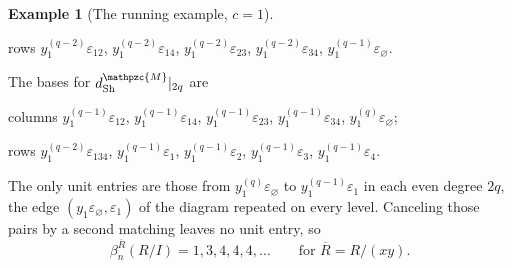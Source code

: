 \documentclass[12pt]{amsart}
\theoremstyle{plain}
\theoremstyle{definition}
\newtheorem{example}[theorem]{Example}
\newcommand{\Rbar}{\overline{R}}
\newcommand{\lift}[1]{\mathpzc{#1}}
\newcommand{\Sh}{\mathrm{Sh}}
\newcommand{\eps}{\varepsilon}
\begin{document}
\begin{example}[The running example, $c = 1$]
    \begin{center}
        rows $y_1^{(q-2)}\eps_{12}$, $y_1^{(q-2)}\eps_{14}$, $y_1^{(q-2)}\eps_{23}$, $y_1^{(q-2)}\eps_{34}$, $y_1^{(q-1)} \eps_\varnothing$.
    \end{center}
    The bases for $d_{\Sh}^{\lift{M}}|_{2q}$ are
    \begin{center}
        columns
     $y_1^{(q-1)} \eps_{12}$, $y_1^{(q-1)} \eps_{14}$, $y_1^{(q-1)} \eps_{23}$, $y_1^{(q-1)} \eps_{34}$, $y_1^{(q)} \eps_\varnothing$;
    \end{center}
    \begin{center}
        rows $y_1^{(q-2)}\eps_{134}$, $y_1^{(q-1)} \eps_1$, $y_1^{(q-1)} \eps_2$, $y_1^{(q-1)} \eps_3$, $y_1^{(q-1)} \eps_4$.
    \end{center}

    The only unit entries are those from $y_1^{(q)} \eps_\varnothing$ to $y_1^{(q-1)} \eps_1$ in each even degree $2q$, the edge $(y_1 \eps_\varnothing, \eps_1)$ of the diagram repeated on every level. Canceling those pairs by a second matching leaves no unit entry, so
    \[
        \beta^{\Rbar}_n(R/I) = 1, 3, 4, 4, 4, \dots \qquad \text{for } \Rbar = R/(xy).
    \]
\end{example}
\end{document}
